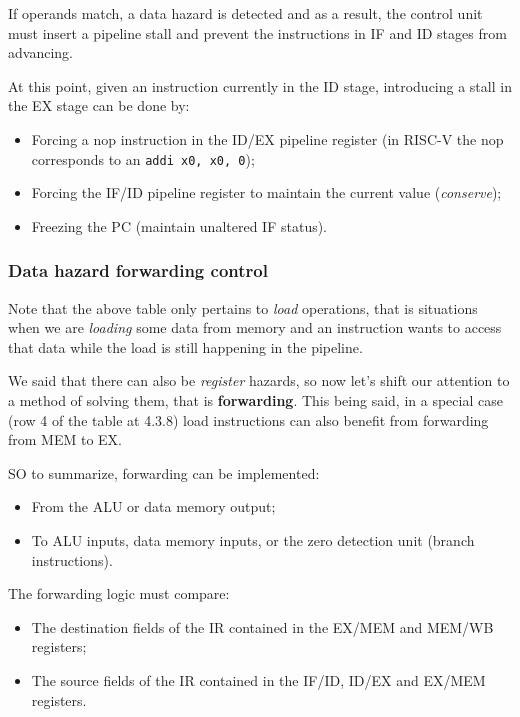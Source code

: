 \documentclass[a4paper,11pt]{article}
\begin{document}
If operands match, a data hazard is detected and as a result, the control unit must insert a pipeline stall and prevent the instructions in IF and ID stages from advancing.

\par\smallskip

At this point, given an instruction currently in the ID stage, introducing a stall in the EX stage can be done by:
\begin{itemize}
	\item Forcing a nop instruction in the ID/EX pipeline register (in RISC-V the nop corresponds to an \lstinline|addi x0, x0, 0|);
	\item Forcing the IF/ID pipeline register to maintain the current value (\textit{conserve});
	\item Freezing the PC (maintain unaltered IF status).
\end{itemize}

\subsubsection{Data hazard forwarding control}

Note that the above table only pertains to \textit{load} operations, that is situations when we are \textit{loading} some data from memory and an instruction wants to access that data while the load is still happening in the pipeline.

We said that there can also be \textit{register} hazards, so now let's shift our attention to a method of solving them, that is \textbf{forwarding}.
This being said, in a special case (row 4 of the table at 4.3.8) load instructions can also benefit from forwarding from MEM to EX.

SO to summarize, forwarding can be implemented:
\begin{itemize}
	\item From the ALU or data memory output;
	\item To ALU inputs, data memory inputs, or the zero detection unit (branch instructions).
\end{itemize}

The forwarding logic must compare:
\begin{itemize}
	\item The destination fields of the IR contained in the EX/MEM and MEM/WB registers;
	\item The source fields of the IR contained in the IF/ID, ID/EX and EX/MEM registers.
\end{itemize}
\end{document}
